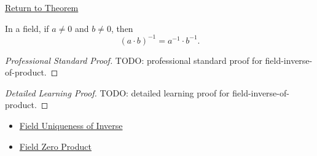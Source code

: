 \newpage
{}
\label{prf:field-inverse-of-product}

\begin{remark*}[Return]
\hyperref[thm:field-inverse-of-product]{Return to Theorem}
\end{remark*}

\begin{theorem*}
In a field, if $a\ne0$ and $b\ne0$, then
\[
(a\cdot b)^{-1}=a^{-1}\cdot b^{-1}.
\]
\end{theorem*}

\begin{proof}[Professional Standard Proof]
\LRAProofBodyStart
TODO: professional standard proof for field-inverse-of-product.
\end{proof}

\begin{proof}[Detailed Learning Proof]
\LRAProofBodyStart
TODO: detailed learning proof for field-inverse-of-product.
\end{proof}

\begin{remark*}
\end{remark*}

\begin{dependencies}
\begin{itemize}
  \item \hyperref[thm:field-uniqueness-of-inverse]{Field Uniqueness of Inverse}
  \item \hyperref[def:zero-divisor]{Field Zero Product}
\end{itemize}
\end{dependencies}

\clearpage

